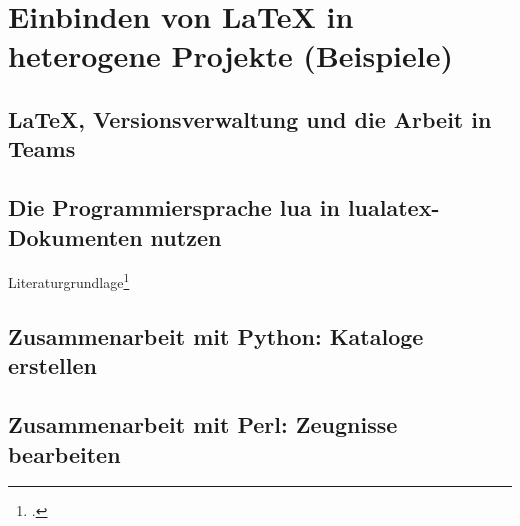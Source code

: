 \chapter{Einbinden von LaTeX in heterogene Projekte (Beispiele)}

\section{LaTeX, Versionsverwaltung und die Arbeit in Teams}

\section{Die Programmiersprache lua in lualatex-Dokumenten nutzen}

Literaturgrundlage\footcite{ierusalimschy:programming}



\section{Zusammenarbeit mit Python: Kataloge erstellen}

\section{Zusammenarbeit mit Perl: Zeugnisse bearbeiten}
